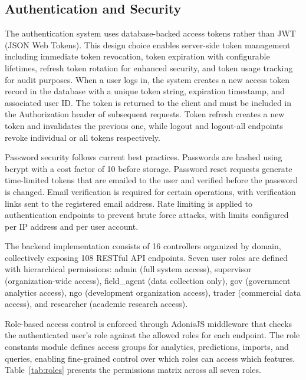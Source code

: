 \documentclass[12pt,a4paper,oneside]{report}
\begin{document}
\subsection{Authentication and Security}
The authentication system uses database-backed access tokens rather than JWT (JSON Web Tokens). This design choice enables server-side token management including immediate token revocation, token expiration with configurable lifetimes, refresh token rotation for enhanced security, and token usage tracking for audit purposes. When a user logs in, the system creates a new access token record in the database with a unique token string, expiration timestamp, and associated user ID. The token is returned to the client and must be included in the Authorization header of subsequent requests. Token refresh creates a new token and invalidates the previous one, while logout and logout-all endpoints revoke individual or all tokens respectively.

Password security follows current best practices. Passwords are hashed using bcrypt with a cost factor of 10 before storage. Password reset requests generate time-limited tokens that are emailed to the user and verified before the password is changed. Email verification is required for certain operations, with verification links sent to the registered email address. Rate limiting is applied to authentication endpoints to prevent brute force attacks, with limits configured per IP address and per user account.

The backend implementation consists of 16 controllers organized by domain, collectively exposing 108 RESTful API endpoints. Seven user roles are defined with hierarchical permissions: admin (full system access), supervisor (organization-wide access), field\_agent (data collection only), gov (government analytics access), ngo (development organization access), trader (commercial data access), and researcher (academic research access).

Role-based access control is enforced through AdonisJS middleware that checks the authenticated user's role against the allowed roles for each endpoint. The role constants module defines access groups for analytics, predictions, imports, and queries, enabling fine-grained control over which roles can access which features. Table~\ref{tab:roles} presents the permissions matrix across all seven roles.
\end{document}
